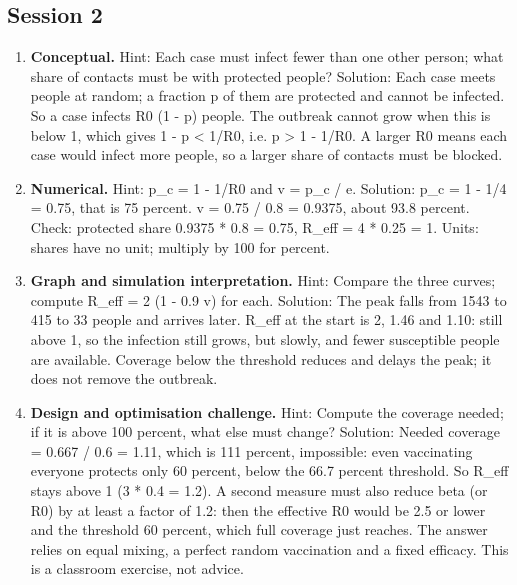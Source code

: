 \documentclass[11pt,a4paper]{article}
\begin{document}
\subsection*{Session 2}
\begin{enumerate}[nosep]
\item \textbf{Conceptual.} Hint: Each case must infect fewer than one other person; what share of contacts must be with protected people? Solution: Each case meets people at random; a fraction p of them are protected and cannot be infected. So a case infects R0 (1 - p) people. The outbreak cannot grow when this is below 1, which gives 1 - p \textless{} 1/R0, i.e. p \textgreater{} 1 - 1/R0. A larger R0 means each case would infect more people, so a larger share of contacts must be blocked.
\item \textbf{Numerical.} Hint: p\_c = 1 - 1/R0 and v = p\_c / e. Solution: p\_c = 1 - 1/4 = 0.75, that is 75 percent. v = 0.75 / 0.8 = 0.9375, about 93.8 percent. Check: protected share 0.9375 * 0.8 = 0.75, R\_eff = 4 * 0.25 = 1. Units: shares have no unit; multiply by 100 for percent.
\item \textbf{Graph and simulation interpretation.} Hint: Compare the three curves; compute R\_eff = 2 (1 - 0.9 v) for each. Solution: The peak falls from 1543 to 415 to 33 people and arrives later. R\_eff at the start is 2, 1.46 and 1.10: still above 1, so the infection still grows, but slowly, and fewer susceptible people are available. Coverage below the threshold reduces and delays the peak; it does not remove the outbreak.
\item \textbf{Design and optimisation challenge.} Hint: Compute the coverage needed; if it is above 100 percent, what else must change? Solution: Needed coverage = 0.667 / 0.6 = 1.11, which is 111 percent, impossible: even vaccinating everyone protects only 60 percent, below the 66.7 percent threshold. So R\_eff stays above 1 (3 * 0.4 = 1.2). A second measure must also reduce beta (or R0) by at least a factor of 1.2: then the effective R0 would be 2.5 or lower and the threshold 60 percent, which full coverage just reaches. The answer relies on equal mixing, a perfect random vaccination and a fixed efficacy. This is a classroom exercise, not advice.
\end{enumerate}
\end{document}
